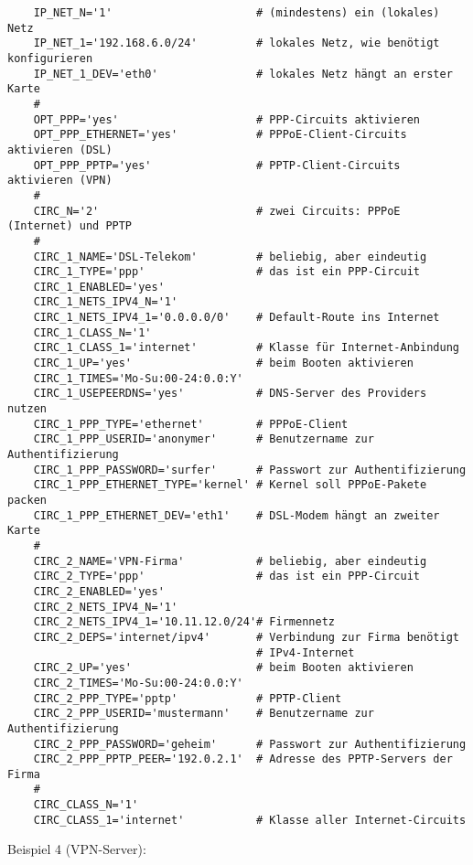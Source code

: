 \begin{example}
\begin{verbatim}
    IP_NET_N='1'                      # (mindestens) ein (lokales) Netz
    IP_NET_1='192.168.6.0/24'         # lokales Netz, wie benötigt konfigurieren
    IP_NET_1_DEV='eth0'               # lokales Netz hängt an erster Karte
    #
    OPT_PPP='yes'                     # PPP-Circuits aktivieren
    OPT_PPP_ETHERNET='yes'            # PPPoE-Client-Circuits aktivieren (DSL)
    OPT_PPP_PPTP='yes'                # PPTP-Client-Circuits aktivieren (VPN)
    #
    CIRC_N='2'                        # zwei Circuits: PPPoE (Internet) und PPTP
    #
    CIRC_1_NAME='DSL-Telekom'         # beliebig, aber eindeutig
    CIRC_1_TYPE='ppp'                 # das ist ein PPP-Circuit
    CIRC_1_ENABLED='yes'
    CIRC_1_NETS_IPV4_N='1'
    CIRC_1_NETS_IPV4_1='0.0.0.0/0'    # Default-Route ins Internet
    CIRC_1_CLASS_N='1'
    CIRC_1_CLASS_1='internet'         # Klasse für Internet-Anbindung
    CIRC_1_UP='yes'                   # beim Booten aktivieren
    CIRC_1_TIMES='Mo-Su:00-24:0.0:Y'
    CIRC_1_USEPEERDNS='yes'           # DNS-Server des Providers nutzen
    CIRC_1_PPP_TYPE='ethernet'        # PPPoE-Client
    CIRC_1_PPP_USERID='anonymer'      # Benutzername zur Authentifizierung
    CIRC_1_PPP_PASSWORD='surfer'      # Passwort zur Authentifizierung
    CIRC_1_PPP_ETHERNET_TYPE='kernel' # Kernel soll PPPoE-Pakete packen
    CIRC_1_PPP_ETHERNET_DEV='eth1'    # DSL-Modem hängt an zweiter Karte
    #
    CIRC_2_NAME='VPN-Firma'           # beliebig, aber eindeutig
    CIRC_2_TYPE='ppp'                 # das ist ein PPP-Circuit
    CIRC_2_ENABLED='yes'
    CIRC_2_NETS_IPV4_N='1'
    CIRC_2_NETS_IPV4_1='10.11.12.0/24'# Firmennetz
    CIRC_2_DEPS='internet/ipv4'       # Verbindung zur Firma benötigt
                                      # IPv4-Internet
    CIRC_2_UP='yes'                   # beim Booten aktivieren
    CIRC_2_TIMES='Mo-Su:00-24:0.0:Y'
    CIRC_2_PPP_TYPE='pptp'            # PPTP-Client
    CIRC_2_PPP_USERID='mustermann'    # Benutzername zur Authentifizierung
    CIRC_2_PPP_PASSWORD='geheim'      # Passwort zur Authentifizierung
    CIRC_2_PPP_PPTP_PEER='192.0.2.1'  # Adresse des PPTP-Servers der Firma
    #
    CIRC_CLASS_N='1'
    CIRC_CLASS_1='internet'           # Klasse aller Internet-Circuits
\end{verbatim}
\end{example}

\noindent
Beispiel 4 (VPN-Server):

